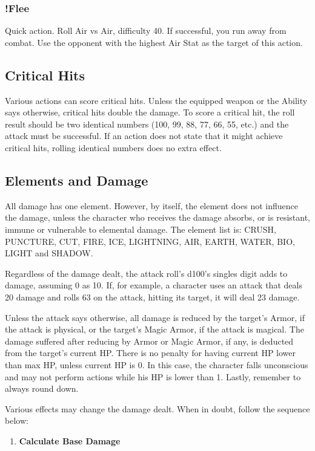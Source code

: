 \begin{multicols}{2}
\subsubsection{!Flee}
Quick action. Roll Air vs Air, difficulty 40. If
successful, you run away from combat. Use the
opponent with the highest Air Stat as the target of
this action.

\subsection{Critical Hits}
Various actions can score critical hits.
Unless the equipped weapon or the Ability says
otherwise, critical hits double the damage. To
score a critical hit, the roll result should be two
identical numbers (100, 99, 88, 77, 66, 55, etc.) and
the attack must be successful. If an action does not
state that it might achieve critical hits, rolling
identical numbers does no extra effect.

\subsection{Elements and Damage}
All damage has one element. However, by
itself, the element does not influence the damage,
unless the character who receives the damage
absorbs, or is resistant, immune or vulnerable to
elemental damage. The element list is: CRUSH,
PUNCTURE, CUT, FIRE, ICE, LIGHTNING, AIR,
EARTH, WATER, BIO, LIGHT and SHADOW.

Regardless of the damage dealt, the attack
roll’s d100’s singles digit adds to damage,
assuming 0 as 10. If, for example, a character uses
an attack that deals 20 damage and rolls 63 on the
attack, hitting its target, it will deal 23 damage.

Unless the attack says otherwise, all
damage is reduced by the target's Armor, if the
attack is physical, or the target’s Magic Armor, if
the attack is magical. The damage suffered after
reducing by Armor or Magic Armor, if any, is
deducted from the target’s current HP. There is no
penalty for having current HP lower than max HP,
unless current HP is 0. In this case, the character
falls unconscious and may not perform actions
while his HP is lower than 1. Lastly, remember to
always round down.

Various effects may change the damage
dealt. When in doubt, follow the sequence below:
\begin{enumerate}
\item \textbf{Calculate Base Damage}


\end{enumerate}
\end{multicols}
